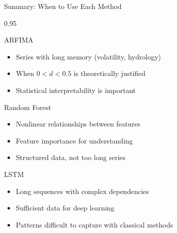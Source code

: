 \documentclass[9pt, aspectratio=169, t]{beamer}
\begin{document}
\begin{frame}{Summary: When to Use Each Method}
    \begin{cminipage}{0.95\textwidth}
    \vspace{-0.9cm}
    \begin{block}{ARFIMA}
        \begin{itemize}\setlength{\itemsep}{0pt}
            \item Series with long memory (volatility, hydrology)
            \item When $0 < d < 0.5$ is theoretically justified
            \item Statistical interpretability is important
        \end{itemize}
    \end{block}

    \begin{block}{Random Forest}
        \begin{itemize}\setlength{\itemsep}{0pt}
            \item Nonlinear relationships between features
            \item Feature importance for understanding
            \item Structured data, not too long series
        \end{itemize}
    \end{block}

    \begin{block}{LSTM}
        \begin{itemize}\setlength{\itemsep}{0pt}
            \item Long sequences with complex dependencies
            \item Sufficient data for deep learning
            \item Patterns difficult to capture with classical methods
        \end{itemize}
    \end{block}
    \end{cminipage}
\end{frame}
\end{document}
